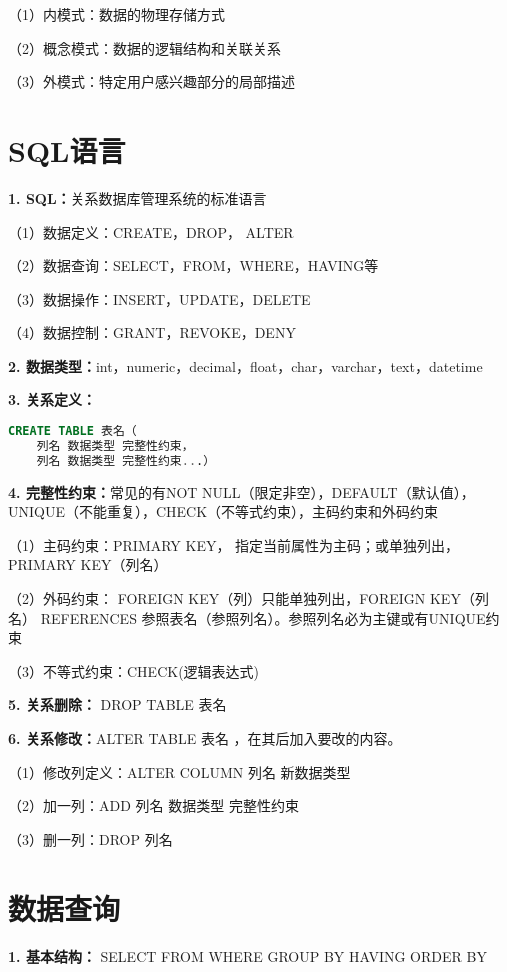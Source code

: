 \quad（1）内模式：数据的物理存储方式

\quad（2）概念模式：数据的逻辑结构和关联关系

\quad（3）外模式：特定用户感兴趣部分的局部描述

\section{SQL语言}

\textbf{1. SQL：}关系数据库管理系统的标准语言

\quad（1）数据定义：CREATE，DROP， ALTER

\quad（2）数据查询：SELECT，FROM，WHERE，HAVING等

\quad（3）数据操作：INSERT，UPDATE，DELETE

\quad（4）数据控制：GRANT，REVOKE，DENY

\textbf{2. 数据类型：}int，numeric，decimal，float，char，varchar，text，datetime

\textbf{3. 关系定义：}
\begin{lstlisting}[language=SQL]
    CREATE TABLE 表名（
    列名 数据类型 完整性约束，
    列名 数据类型 完整性约束...）
\end{lstlisting}

\textbf{4. 完整性约束：}常见的有NOT NULL（限定非空），DEFAULT（默认值），UNIQUE（不能重复），CHECK（不等式约束），主码约束和外码约束

\quad（1）主码约束：PRIMARY KEY， 指定当前属性为主码；或单独列出，PRIMARY KEY（列名）

\quad（2）外码约束： FOREIGN KEY（列）只能单独列出，FOREIGN KEY（列名） REFERENCES 参照表名（参照列名）。参照列名必为主键或有UNIQUE约束

\quad（3）不等式约束：CHECK(逻辑表达式)

\textbf{5. 关系删除：} DROP TABLE 表名

\textbf{6. 关系修改：}ALTER TABLE 表名 ，在其后加入要改的内容。

\quad（1）修改列定义：ALTER COLUMN 列名 新数据类型 

\quad（2）加一列：ADD 列名 数据类型 完整性约束

\quad（3）删一列：DROP 列名

\section{数据查询}

\textbf{1. 基本结构：} SELECT FROM WHERE GROUP BY HAVING ORDER BY

